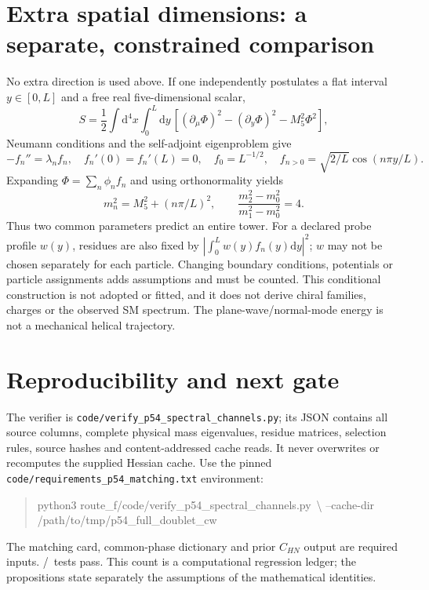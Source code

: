 \documentclass[11pt]{article}
\newcommand{\dd}{\mathrm d}
\begin{document}
\section{Extra spatial dimensions: a separate, constrained comparison}
No extra direction is used above. If one independently postulates a
flat interval $y\in[0,L]$ and a free real five-dimensional scalar,
\begin{equation}
 S=\frac12\int\dd^4x\int_0^L\dd y\,
 \left[(\partial_\mu\Phi)^2-(\partial_y\Phi)^2-M_5^2\Phi^2\right],
\end{equation}
Neumann conditions and the self-adjoint eigenproblem give
\begin{equation}
 -f_n''=\lambda_nf_n,\quad f_n'(0)=f_n'(L)=0,\quad
 f_0=L^{-1/2},\quad f_{n>0}=\sqrt{2/L}\cos(n\pi y/L).
\end{equation}
Expanding $\Phi=\sum_n\phi_n f_n$ and using orthonormality yields
\begin{equation}
 m_n^2=M_5^2+(n\pi/L)^2,\qquad
 \frac{m_2^2-m_0^2}{m_1^2-m_0^2}=4.
\end{equation}
Thus two common parameters predict an entire tower. For a declared
probe profile $w(y)$, residues are also fixed by
$|\int_0^L w(y)f_n(y)\dd y|^2$; $w$ may not be chosen separately for
each particle. Changing boundary conditions, potentials or particle
assignments adds assumptions and must be counted. This conditional
construction is not adopted or fitted, and it does not derive chiral
families, charges or the observed SM spectrum. The plane-wave/normal-mode
energy is not a mechanical helical trajectory.

\section{Reproducibility and next gate}
The verifier is \texttt{code/verify\_p54\_spectral\_channels.py}; its JSON
contains all source columns, complete physical mass eigenvalues, residue
matrices, selection rules, source hashes and content-addressed cache
reads. It never overwrites or recomputes the supplied Hessian cache.
Use the pinned \texttt{code/requirements\_p54\_matching.txt} environment:
\begin{quote}\small\ttfamily
python3 route\_f/code/verify\_p54\_spectral\_channels.py\ {\normalfont\textbackslash}\newline
\hspace*{1em}--cache-dir /path/to/tmp/p54\_full\_doublet\_cw
\end{quote}
The matching card, common-phase dictionary and prior $C_{HN}$ output
are required inputs. \ChecksPassed/\ChecksTotal\ tests pass. This count
is a computational regression ledger; the propositions state separately
the assumptions of the mathematical identities.
\end{document}
